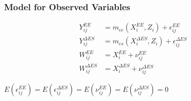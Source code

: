 \documentclass[handout]{beamer}\usepackage[]{graphicx}\usepackage[]{color}
\begin{document}
\begin{frame}
\frametitle{Model for Observed Variables}


\begin{align*}
  Y_{ij}^{EE} &= m_{ee}(X_i^{EE} ,Z_i) + \epsilon_{ij}^{EE}   \\
  Y_{ij}^{\Delta ES} &= m_{es}(X_i^{\Delta ES} ,Z_i) + \epsilon_{ij}^{\Delta ES} \\
  W_{ij}^{EE} &= X_i^{EE}  + \nu_{ij}^{EE} \\
  W_{ij}^{\Delta ES} &= X_i^{\Delta ES}  + \nu_{ij}^{\Delta ES}
\end{align*}

\vspace{0.5cm}
$E(\epsilon_{ij}^{EE}) = E(\epsilon_{ij}^{\Delta ES}) = E(\nu_{ij}^{EE}) = E(\nu_{ij}^{\Delta ES}) = 0$

\end{frame}
\end{document}
